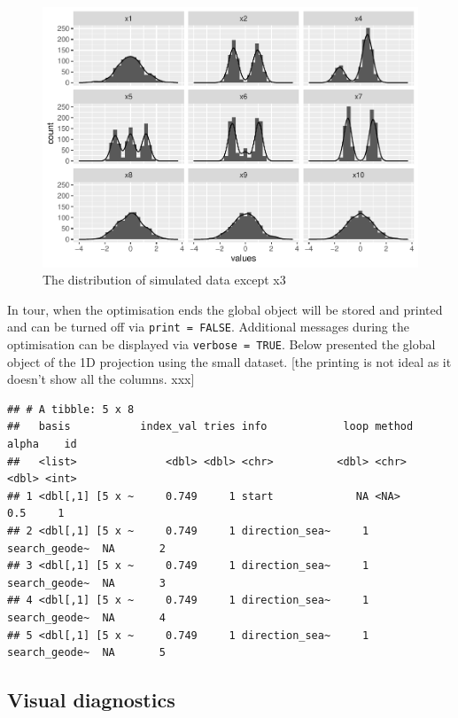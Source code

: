 \documentclass[12pt]{article}
\begin{document}
\begin{figure}
\centering
\includegraphics{paper_files/figure-latex/origin-data-1.pdf}
\caption{\label{origin-data} The distribution of simulated data except
x3}
\end{figure}

In tour, when the optimisation ends the global object will be stored and
printed and can be turned off via \texttt{print\ =\ FALSE}. Additional
messages during the optimisation can be displayed via
\texttt{verbose\ =\ TRUE}. Below presented the global object of the 1D
projection using the small dataset. {[}the printing is not ideal as it
doesn't show all the columns. xxx{]}

\begin{verbatim}
## # A tibble: 5 x 8
##   basis           index_val tries info            loop method        alpha    id
##   <list>              <dbl> <dbl> <chr>          <dbl> <chr>         <dbl> <int>
## 1 <dbl[,1] [5 x ~     0.749     1 start             NA <NA>            0.5     1
## 2 <dbl[,1] [5 x ~     0.749     1 direction_sea~     1 search_geode~  NA       2
## 3 <dbl[,1] [5 x ~     0.749     1 direction_sea~     1 search_geode~  NA       3
## 4 <dbl[,1] [5 x ~     0.749     1 direction_sea~     1 search_geode~  NA       4
## 5 <dbl[,1] [5 x ~     0.749     1 direction_sea~     1 search_geode~  NA       5
\end{verbatim}

\hypertarget{visual-diagnostics}{%
\subsection{Visual diagnostics}\label{visual-diagnostics}}
\end{document}
